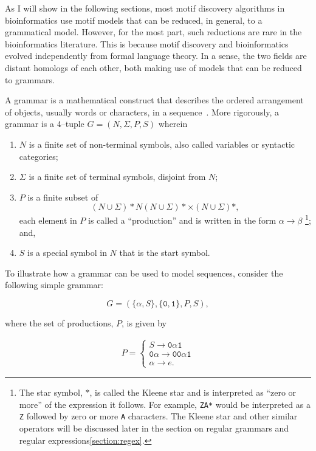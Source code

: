 As I will show in the following sections, most motif discovery
algorithms in bioinformatics use motif models that can be reduced,
in general, to a grammatical model.  However, for the most part,
such reductions are rare in the bioinformatics literature. This is
because motif discovery and bioinformatics evolved independently
from formal language theory.  In a sense, the two fields are distant
homologs of each other, both making use of models that can be
reduced to grammars.


A grammar is a mathematical construct that describes the ordered
arrangement of objects, usually words or characters, in a
sequence~\cite{aho1979theory}.
 More rigorously, a grammar is a 4--tuple $G = (N,\Sigma,P,S) $
 wherein
\begin{enumerate}\label{grammarDefinition}
  \item $N$ is a finite set of non-terminal symbols, also called
  variables or syntactic categories;
  \item $\Sigma$ is a finite set of terminal symbols, disjoint from
  $N$;
  \item $P$ is a finite subset of
    \begin{equation}\label{eqn:production}
        (N\cup\Sigma)*N(N\cup\Sigma)*\times(N\cup\Sigma)*,
    \end{equation}
    each element in $P$ is called a ``production'' and
    is written in the form $\alpha\rightarrow\beta$%
    \footnote{The star symbol, $*$, is called the Kleene star and is
    interpreted as ``zero or more'' of the expression it follows.
    For example, \texttt{ZA*} would be interpreted as a \texttt{Z}
    followed by zero or more \texttt{A} characters.  The Kleene star
    and other similar operators will be discussed later in the
    section on regular grammars and regular expressions\vref{section:regex}.
    }; and,
    \item $S$ is a special symbol in $N$ that is the start symbol.
\end{enumerate}

To illustrate how a grammar can be used to model sequences, consider
the following simple grammar:

\begin{equation}\label{eqn:simpleGrammar}
    G = (\{\alpha, S\},\{\texttt{0}, \texttt{1}\},P,S),
\end{equation}

where the set of productions, $P$, is given by

\begin{align}\label{eqn:simpleProduction}
    P =
    \begin{cases}
    S \rightarrow \texttt{0}\alpha \texttt{1}\\
    \texttt{0}\alpha \rightarrow \texttt{00}\alpha \texttt{1}\\
    \alpha \rightarrow e.
    \end{cases}
\end{align}

